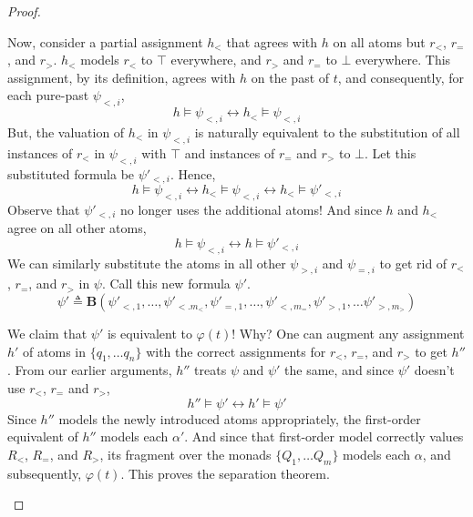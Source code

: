 \documentclass[a4paper,UKenglish,cleveref, autoref, thm-restate, numberwithinsect]{lipics-v2021}
\begin{document}
\begin{proof}
\begin{description}
        Now, consider a partial assignment $h_<$ that agrees with $h$ on all atoms but $r_<$, $r_=$, and $r_>$. $h_<$ models $r_<$ to $\top$ everywhere, and $r_>$ and $r_=$ to $\bot$ everywhere. This assignment, by its definition, agrees with $h$ on the past of $t$, and consequently, for each pure-past $\psi_{<, i}$,
        \begin{equation*}
            h \vDash \psi_{<, i} \longleftrightarrow h_< \vDash \psi_{<, i}
        \end{equation*}
        But, the valuation of $h_<$ in $\psi_{<, i}$ is naturally equivalent to the substitution of all instances of $r_<$ in $\psi_{<, i}$ with $\top$ and instances of $r_=$ and $r_>$ to $\bot$. Let this substituted formula be $\psi'_{<, i}$. Hence,
        \begin{equation*}
            h \vDash \psi_{<, i} \longleftrightarrow h_< \vDash \psi_{<, i} \longleftrightarrow h_< \vDash \psi'_{<, i}
        \end{equation*}
        Observe that $\psi'_{<, i}$ no longer uses the additional atoms! And since $h$ and $h_<$ agree on all other atoms,
        \begin{equation*}
            h \vDash \psi_{<, i} \longleftrightarrow h \vDash \psi'_{<, i}
        \end{equation*}
        We can similarly substitute the atoms in all other $\psi_{>, i}$ and $\psi_{=, i}$ to get rid of $r_<$, $r_=$, and $r_>$ in $\psi$. Call this new formula $\psi'$.
        \begin{equation*}
            \psi' \triangleq \mathbf{B}(\psi'_{<, 1}, \ldots, \psi'_{<. m_<}, \psi'_{=, 1}, \ldots, \psi'_{<, m_=}, \psi'_{>, 1}, \ldots \psi'_{>, m_>})
        \end{equation*}

        We claim that $\psi'$ is equivalent to $\varphi(t)$! Why? One can augment any assignment $h'$ of atoms in $\{q_1, \ldots q_n\}$ with the correct assignments for $r_<$, $r_=$, and $r_>$ to get $h''$. From our earlier arguments, $h''$ treats $\psi$ and $\psi'$ the same, and since $\psi'$ doesn't use $r_<$, $r_=$ and $r_>$,
        \begin{equation*}
            h'' \vDash \psi' \longleftrightarrow h' \vDash \psi'
        \end{equation*}
        Since $h''$ models the newly introduced atoms appropriately, the first-order equivalent of $h''$ models each $\alpha'$. And since that first-order model correctly values $R_<$, $R_=$, and $R_>$, its fragment over the monads $\{Q_1, \ldots Q_m\}$ models each $\alpha$, and subsequently, $\varphi(t)$. This proves the separation theorem.
    \end{description}
\end{proof}
\end{document}
